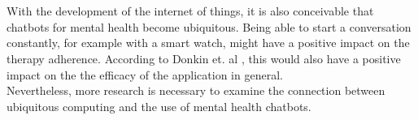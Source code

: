 \documentclass[sigconf, nonacm]{acmart}
\begin{document}
\\\\
With the development of the internet of things, it is also conceivable that chatbots for mental health become ubiquitous. Being able to start a conversation constantly, for example with a smart watch, might have a positive impact on the therapy adherence. According to Donkin et. al \cite{Donkin2011}, this would also have a positive impact on the the efficacy of the application in general.
\\
Nevertheless, more research is necessary to examine the connection between ubiquitous computing and the use of mental health chatbots.



\appendix
\end{document}
